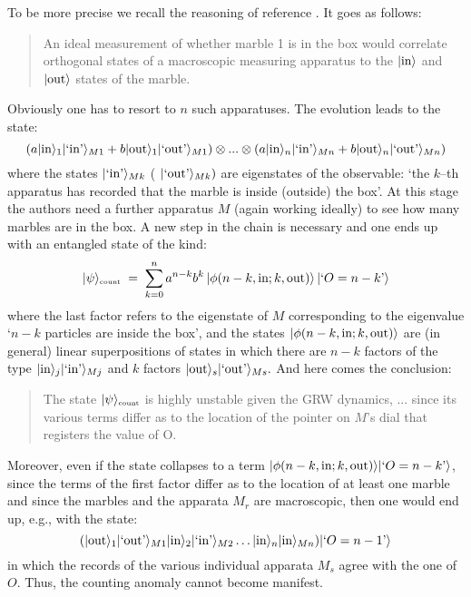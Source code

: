 \documentclass[10pt,a4paper]{article}
\begin{document}
To be more precise we recall the reasoning of reference
\cite{cli1}. It goes as follows:
\begin{quotation}
An ideal measurement of whether marble 1 is in the box would
correlate orthogonal states of a macroscopic measuring apparatus
to the $|\makebox{in}\rangle$ and $|\makebox{out}\rangle$ states
of the marble.
\end{quotation}
Obviously one has to resort to $n$ such apparatuses. The evolution
leads to the state:
\begin{equation} \label{f}
(a|\makebox{in}\rangle_{1} |\makebox{`in'}\rangle_{M1} +
b|\makebox{out}\rangle_{1} |\makebox{`out'}\rangle_{M1}) \otimes
...\otimes (a|\makebox{in}\rangle_{n} |\makebox{`in'}\rangle_{Mn}
+ b|\makebox{out}\rangle_{n} |\makebox{`out'}\rangle_{Mn})
\end{equation}
where the states $|\makebox{`in'}\rangle_{Mk}$ (
$|\makebox{`out'}\rangle_{Mk})$ are eigenstates of the observable:
`the $k$--th apparatus has recorded that the marble is inside
(outside) the box'. At this stage the authors need a further
apparatus $M$ (again working ideally) to see how many marbles are
in the box. A new step in the chain is necessary and one ends up
with an entangled state of the kind:
\begin{equation} \label{g}
|\psi\rangle_{\makebox{\tiny count}} \; = \;
\sum_{k=0}^{n}a^{n-k}b^{k}\, |\phi
(n-k,\makebox{in};k,\makebox{out})\rangle \, |\makebox{`$O =
n-k$'}\rangle
\end{equation}
where the last factor refers to the eigenstate of $M$
corresponding to the eigenvalue `$n-k$ particles are inside the
box', and the states $|\phi
(n-k,\makebox{in};k,\makebox{out})\rangle$ are (in general) linear
superpositions of states in which there are $n-k$ factors of the
type $|\makebox{in}\rangle_{j}|\makebox{`in'}\rangle_{Mj}$ and $k$
factors $|\makebox{out}\rangle_{s}|\makebox{`out'}\rangle_{Ms}.$
And here comes the conclusion:
\begin{quotation}
The state $|\psi\rangle_{\makebox{\tiny count}}$ is highly
unstable given the GRW dynamics, ... since its various terms
differ as to the location of the pointer on $M$'s dial that
registers the value of O.
\end{quotation}
Moreover, even if the state collapses to a term $|\phi
(n-k,\makebox{in};k,\makebox{out})\rangle |\makebox{`$O =
n-k$'}\rangle$,  since the terms of the first factor differ as to
the location of at least one marble and since the marbles and the
apparata $M_{r}$ are macroscopic, then one would end up, e.g.,
with the state:
\begin{equation} \label{h}
(|\makebox{out}\rangle_{1} |\makebox{`out'}\rangle_{M1}
|\makebox{in}\rangle_{2} |\makebox{`in'}\rangle_{M2} \ldots
|\makebox{in}\rangle_{n} |\makebox{in}\rangle_{Mn}) |\makebox{`$O
= n - 1$'}\rangle
\end{equation}
in which the records of the various individual apparata $M_{s}$
agree with the one of $O$. Thus, the counting anomaly cannot
become manifest.
\end{document}

